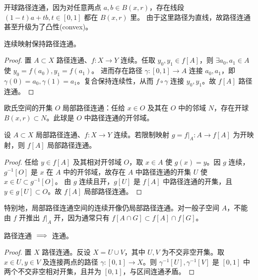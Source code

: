 \begin{example}
    开球路径连通，因为对任意两点 $a,b\in B(x,r)$，存在线段
 $(1-t)a+tb,t\in[0,1]$ 都在 $B(x,r)$ 里。
 由于这里路径为直线，故路径连通甚至升级为了凸性(convex)。
\end{example}

\begin{theorem}
    连续映射保持路径连通。
\end{theorem}

\begin{proof}
    置 $A\subset X$ 路径连通、$f:X\to Y$ 连续。任取 $y_0,y_1\in f[A]$，则 $\exists a_0,a_1\in A$ 使 $y_0=f(a_0),y_1=f(a_1)$。
    进而存在路径 $\gamma:[0,1]\to A$ 连接 $a_0,a_1$，即 $\gamma(0)=a_0,\gamma(1)=a_1$。复合保持连续性，从而 $f\circ\gamma$ 连接 $y_0,y_1$。故 $f[A]$ 路径连通。
\end{proof}

\begin{example}
    欧氏空间的开集 $O$ 局部路径连通：任给 $x\in O$ 及其在 $O$ 中的邻域 $N$，存在开球 $B(x,r)\subset N$。此球是 $O$ 中路径连通的开邻域。
\end{example}

\begin{theorem}
    设 $A\subset X$ 局部路径连通、$f:X\to Y$ 连续。若限制映射 $g=f|_A:A\to f[A]$ 为开映射，则 $f[A]$ 局部路径连通。
\end{theorem}
\begin{proof}
    任给 $y\in f[A]$ 及其相对开邻域 $O$，取 $x\in A$ 使 $g(x)=y$。因 $g$ 连续，$g^{-1}[O]$ 是 $x$ 在 $A$ 中的开邻域，故存在 $A$ 中路径连通的开集 $U$ 使 $x\in U\subset g^{-1}[O]$。
    由 $g$ 连续且开，$g[U]$ 是 $f[A]$ 中路径连通的开集，且 $y\in g[U]\subset O$。故 $f[A]$ 局部路径连通。
\end{proof}
\begin{remark}
    特别地，局部路径连通空间的连续开像仍局部路径连通。对一般子空间 $A$，不能由 $f$ 开推出 $f|_A$ 开，因为通常只有 $f[A\cap G]\subset f[A]\cap f[G]$。
\end{remark}

\begin{theorem}
    路径连通 $\implies$ 连通。
\end{theorem}
\begin{proof}
    置 $X$ 路径连通。反设 $X=U\cup V$，其中 $U,V$ 为不交非空开集。取 $x\in U,y\in V$ 及连接两点的路径 $\gamma:[0,1]\to X$。则 $\gamma^{-1}[U],\gamma^{-1}[V]$ 是 $[0,1]$ 中两个不交非空相对开集，且并为 $[0,1]$，与区间连通矛盾。
\end{proof}

